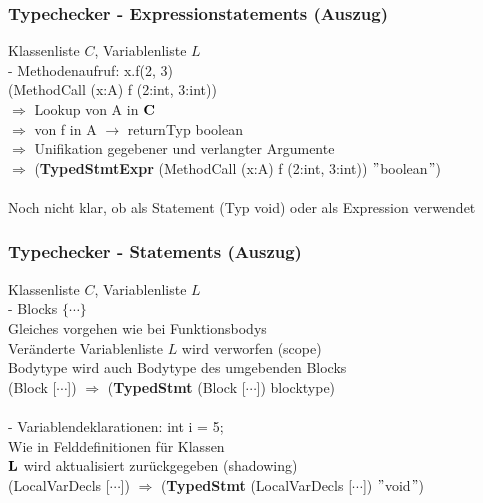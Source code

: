\begin{frame}
    \frametitle{Typechecker - Expressionstatements (Auszug)}
Klassenliste $C$, Variablenliste $L$ \\
- Methodenaufruf: x.f(2, 3) \\
(MethodCall (x:A) f (2:int, 3:int)) \\
$\Rightarrow$ Lookup von A in ${\bf C}$ \\
$\Rightarrow$ von f in A $\rightarrow$ returnTyp boolean\\
$\Rightarrow$ Unifikation gegebener und verlangter Argumente \\
$\Rightarrow$ ({\bf TypedStmtExpr} (MethodCall (x:A) f (2:int, 3:int)) $"$boolean$"$) \\
\ \\
\pause
Noch nicht klar, ob als Statement (Typ void) oder als Expression verwendet
\end{frame}

\begin{frame}
    \frametitle{Typechecker - Statements (Auszug)}
Klassenliste $C$, Variablenliste $L$ \\
- Blocks $\{ \cdots \}$\\
Gleiches vorgehen wie bei Funktionsbodys \\
Veränderte Variablenliste $L$ wird verworfen (scope) \\
Bodytype wird auch Bodytype des umgebenden Blocks \\
(Block [$\cdots$]) $\Rightarrow$ ({\bf TypedStmt} (Block [$\cdots$]) blocktype) \\
\ \\
\pause
- Variablendeklarationen: int i = 5;\\
Wie in Felddefinitionen für Klassen \\
${\bf L}$ wird aktualisiert zurückgegeben (shadowing) \\
(LocalVarDecls [$\cdots$]) $\Rightarrow$ ({\bf TypedStmt} (LocalVarDecls [$\cdots$]) $"$void$"$)
\end{frame}